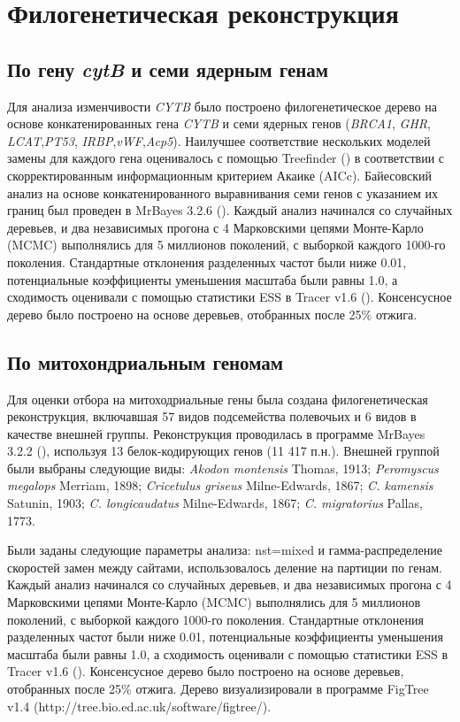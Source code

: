 \section{Филогенетическая реконструкция}

\subsection{По гену \textit{cytB} и семи ядерным генам}

Для анализа изменчивости \textit{CYTB} было построено филогенетическое дерево на основе конкатенированных гена \textit{CYTB} и семи ядерных генов (\textit{BRCA1}, \textit{GHR}, \textit{LCAT},\textit{PT53}, \textit{IRBP},\textit{vWF},\textit{Acp5}). Наилучшее соответствие нескольких моделей замены для каждого гена оценивалось с помощью Treefinder (\cite{Jobb2004}) в соответствии с скорректированным информационным критерием Акаике (AICc). Байесовский анализ на основе конкатенированного выравнивания семи генов с указанием их границ был проведен в MrBayes 3.2.6 (\cite{Ronquist2012}). Каждый анализ начинался со случайных деревьев, и два независимых прогона с 4 Марковскими цепями Монте-Карло (MCMC) выполнялись для 5 миллионов поколений, с выборкой каждого 1000-го поколения. Стандартные отклонения разделенных частот были ниже 0.01, потенциальные коэффициенты уменьшения масштаба были равны 1.0, а сходимость оценивали с помощью статистики ESS в Tracer v1.6 (\cite{Rambaut2014}). Консенсусное дерево было построено на основе деревьев, отобранных после 25\% отжига.

\subsection{По митохондриальным геномам}
Для оценки отбора на митоходриальные гены была создана филогенетическая реконструкция, включавшая 57 видов подсемейства полевочьих и 6 видов в качестве внешней группы. Реконструкция проводилась в программе MrBayes 3.2.2 (\cite{Ronquist2012}), используя 13 белок-кодирующих генов (11 417 п.н.). Внешней группой были выбраны следующие виды: \textit{Akodon montensis} Thomas, 1913; \textit{Peromyscus megalops} Merriam, 1898; \textit{Cricetulus griseus} Milne-Edwards, 1867; \textit{C. kamensis} Satunin, 1903; \textit{C. longicaudatus} Milne-Edwards, 1867; \textit{C. migratorius} Pallas, 1773.
 
Были заданы следующие параметры анализа: nst=mixed и гамма-распределение скоростей замен между сайтами, использовалось деление на партиции по генам. Каждый анализ начинался со случайных деревьев, и два независимых прогона с 4 Марковскими цепями Монте-Карло (MCMC) выполнялись для 5 миллионов поколений, с выборкой каждого 1000-го поколения. Стандартные отклонения разделенных частот были ниже 0.01, потенциальные коэффициенты уменьшения масштаба были равны 1.0, а сходимость оценивали с помощью статистики ESS в Tracer v1.6 (\cite{Rambaut2014}). Консенсусное дерево было построено на основе деревьев, отобранных после 25\% отжига. Дерево визуализировали в программе FigTree v1.4 (http://tree.bio.ed.ac.uk/software/figtree/).

